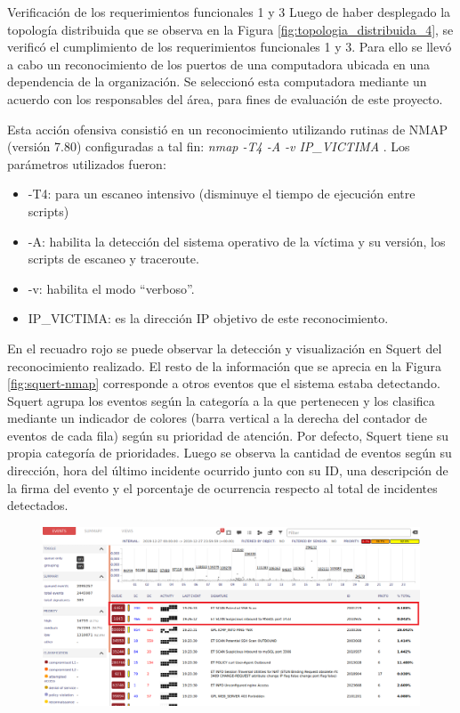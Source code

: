     \begin{section}{Verificación de los requerimientos funcionales 1 y 3}
    Luego de haber desplegado la topología distribuida que se observa en la Figura \ref{fig:topologia_distribuida_4}, se verificó el cumplimiento de los requerimientos funcionales 1 y 3. Para ello se llevó a cabo un reconocimiento de los puertos de una computadora ubicada en una dependencia de la organización. Se seleccionó esta computadora mediante un acuerdo con los responsables del área, para fines de evaluación de este proyecto. \par
    Esta acción ofensiva consistió en un reconocimiento utilizando rutinas de NMAP \cite{nmap} (versión 7.80) configuradas a tal fin: \textit{nmap -T4 -A -v IP\_VICTIMA} . Los parámetros utilizados fueron:
    \begin{itemize}
        \item -T4: para un escaneo intensivo (disminuye el tiempo de ejecución entre scripts)
        \item -A: habilita la detección del sistema operativo de la víctima y su versión, los scripts de escaneo y traceroute.
        \item -v: habilita el modo “verboso”.
        \item IP\_VICTIMA: es la dirección IP objetivo de este reconocimiento.
    \end{itemize}
    En el recuadro rojo se puede observar la detección y visualización en Squert del reconocimiento realizado. El resto de la información que se aprecia en la Figura \ref{fig:squert-nmap} corresponde a otros eventos que el sistema estaba detectando. Squert agrupa los eventos según la categoría a la que pertenecen y los clasifica mediante un indicador de colores (barra vertical a la derecha del contador de eventos de cada fila) según su prioridad de atención. Por defecto, Squert tiene su propia categoría de prioridades. Luego se observa la cantidad de eventos según su dirección, hora del último incidente ocurrido junto con su ID, una descripción de la firma del evento y el porcentaje de ocurrencia respecto al total de incidentes detectados.
    \begin{figure}[H]
        \centering
        \includegraphics[width=1\textwidth]{./iteracion_1_imagenes/Squert_NMAP.png}

\end{figure}
\end{section}

